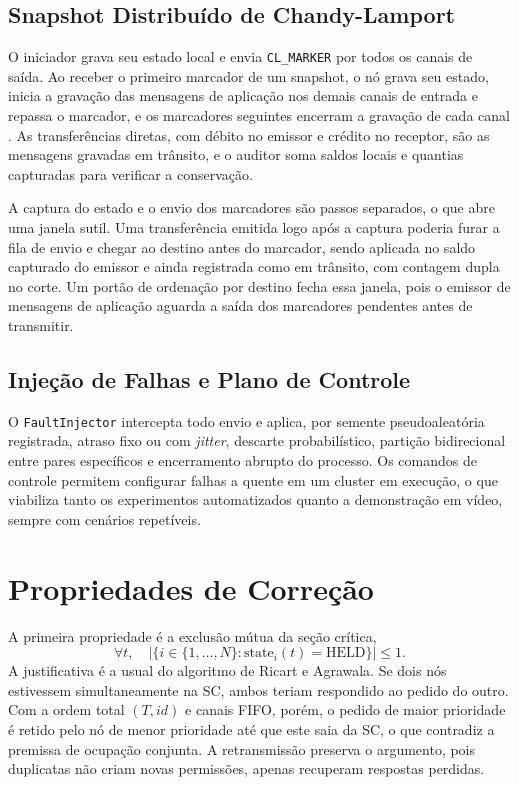 \documentclass[conference]{IEEEtran}
\begin{document}
\subsection{Snapshot Distribuído de Chandy-Lamport}
O iniciador grava seu estado local e envia \texttt{CL\_MARKER} por todos os
canais de saída. Ao receber o primeiro marcador de um snapshot, o nó grava
seu estado, inicia a gravação das mensagens de aplicação nos demais canais de
entrada e repassa o marcador, e os marcadores seguintes encerram a gravação de
cada canal \cite{chandy1985distributed}. As transferências diretas, com débito
no emissor e crédito no receptor, são as mensagens gravadas em trânsito, e o
auditor soma saldos locais e quantias capturadas para verificar a conservação.

A captura do estado e o envio dos marcadores são passos separados, o que abre
uma janela sutil. Uma transferência emitida logo após a captura poderia furar
a fila de envio e chegar ao destino antes do marcador, sendo aplicada no
saldo capturado do emissor e ainda registrada como em trânsito, com contagem
dupla no corte. Um portão de ordenação por destino fecha essa janela, pois o
emissor de mensagens de aplicação aguarda a saída dos marcadores pendentes
antes de transmitir.

\subsection{Injeção de Falhas e Plano de Controle}
O \texttt{FaultInjector} intercepta todo envio e aplica, por semente
pseudoaleatória registrada, atraso fixo ou com \emph{jitter}, descarte
probabilístico, partição bidirecional entre pares específicos e encerramento
abrupto do processo. Os comandos de controle permitem configurar falhas a
quente em um cluster em execução, o que viabiliza tanto os experimentos
automatizados quanto a demonstração em vídeo, sempre com cenários repetíveis.

\section{Propriedades de Correção}
A primeira propriedade é a exclusão mútua da seção crítica,
\begin{equation}
    \forall t, \quad \left| \{ i \in \{1,\dots,N\} : \text{state}_i(t) = \text{HELD} \} \right| \le 1.
    \label{eq:exclusao}
\end{equation}
A justificativa é a usual do algoritmo de Ricart e Agrawala. Se dois nós
estivessem simultaneamente na SC, ambos teriam respondido ao pedido do outro.
Com a ordem total $(T, id)$ e canais FIFO, porém, o pedido de maior prioridade
é retido pelo nó de menor prioridade até que este saia da SC, o que contradiz
a premissa de ocupação conjunta. A retransmissão preserva o argumento, pois
duplicatas não criam novas permissões, apenas recuperam respostas perdidas.
\end{document}
